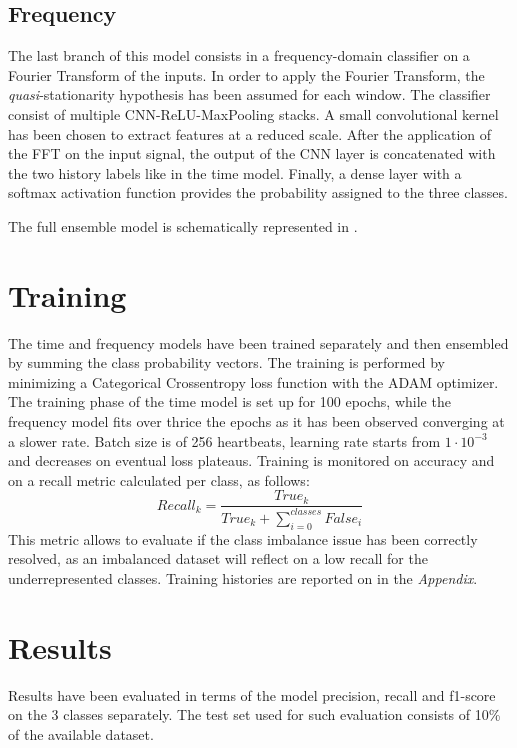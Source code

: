 \documentclass[conference]{IEEEtran}
\begin{document}
\subsection{Frequency}
    The last branch of this model consists in a frequency-domain
    classifier on a Fourier Transform of the inputs. In order to apply
    the Fourier Transform, the \textit{quasi}-stationarity hypothesis
    has been assumed for each window.
    The classifier consist of multiple CNN-ReLU-MaxPooling stacks. A
    small convolutional kernel has been chosen to extract features at
    a reduced scale. After the application of the FFT on the input
    signal, the output of the CNN layer is concatenated with the two
    history labels like in the time model. Finally, a dense layer with
    a softmax activation function provides the probability assigned to
    the three classes.  

    The full ensemble model is schematically represented in
    .

\section{Training}
    The time and frequency models have been trained separately and
    then ensembled by summing the class probability vectors. The
    training is performed by minimizing a Categorical Crossentropy
    loss function with the ADAM optimizer. The training phase of the
    time model is set up for 100 epochs, while the frequency model
    fits over thrice the epochs as it has been observed converging at
    a slower rate. Batch size is of 256 heartbeats, learning rate
    starts from $1\cdot10^{-3}$ and decreases on eventual loss
    plateaus. Training is monitored on accuracy and on a recall metric
    calculated per class, as follows:
    \begin{equation}
        Recall_k=\frac{True_k}{True_k+\sum_{i=0}^{classes}False_i}
    \end{equation}
    This metric allows to evaluate if the class imbalance issue has
    been correctly resolved, as an imbalanced dataset will reflect on
    a low recall for the underrepresented classes. Training histories
    are reported on  in the \textit{Appendix}.

\section{Results}
    Results have been evaluated in terms of the model precision,
    recall and f1-score on the 3 classes separately. The test set used
    for such evaluation consists of 10\% of the available dataset.
    
\end{document}
